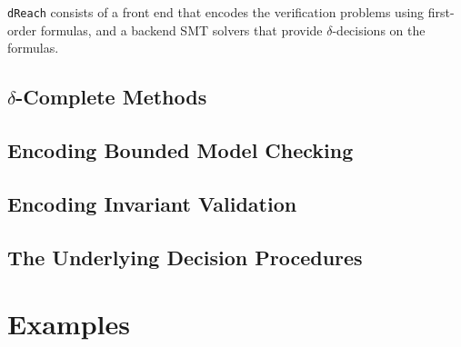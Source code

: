 \documentclass[envcountsect]{llncs}
\begin{document}
{\tt dReach} consists of a front end that encodes the verification problems
using first-order formulas, and a backend SMT solvers that provide
$\delta$-decisions on the formulas.

\subsection{$\delta$-Complete Methods}

\subsection{Encoding Bounded Model Checking}

\subsection{Encoding Invariant Validation}

\subsection{The Underlying Decision Procedures}


\section{Examples}




\end{document}
